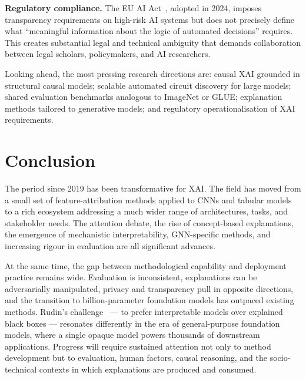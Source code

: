 \documentclass[12pt]{article}
\begin{document}
\textbf{Regulatory compliance.} The EU AI Act~\cite{euaiact2021}, adopted in 2024,
imposes transparency requirements on high-risk AI systems but does not precisely
define what ``meaningful information about the logic of automated decisions''
requires. This creates substantial legal and technical ambiguity that demands
collaboration between legal scholars, policymakers, and AI researchers.

Looking ahead, the most pressing research directions are: causal XAI grounded in
structural causal models; scalable automated circuit discovery for large models;
shared evaluation benchmarks analogous to ImageNet or GLUE; explanation methods
tailored to generative models; and regulatory operationalisation of XAI
requirements.

\section{Conclusion}
\label{sec:conclusion}

The period since 2019 has been transformative for XAI. The field has moved from
a small set of feature-attribution methods applied to CNNs and tabular models to a
rich ecosystem addressing a much wider range of architectures, tasks, and
stakeholder needs. The attention debate, the rise of concept-based explanations,
the emergence of mechanistic interpretability, GNN-specific methods, and
increasing rigour in evaluation are all significant advances.

At the same time, the gap between methodological capability and deployment
practice remains wide. Evaluation is inconsistent, explanations can be
adversarially manipulated, privacy and transparency pull in opposite directions,
and the transition to billion-parameter foundation models has outpaced existing
methods. Rudin's challenge~\cite{rudin2019stop} --- to prefer interpretable models
over explained black boxes --- resonates differently in the era of general-purpose
foundation models, where a single opaque model powers thousands of downstream
applications. Progress will require sustained attention not only to method
development but to evaluation, human factors, causal reasoning, and the
socio-technical contexts in which explanations are produced and consumed.



\end{document}
